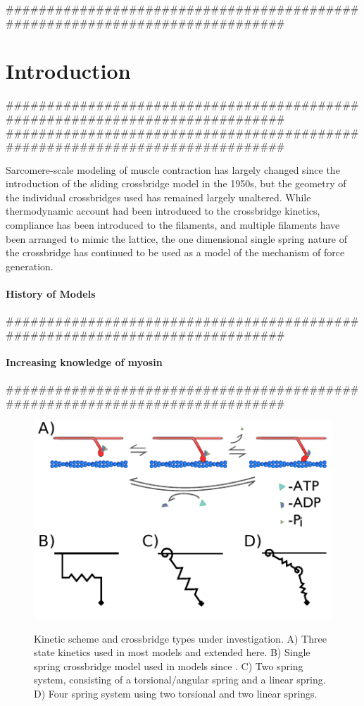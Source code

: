 \documentclass[11pt]{article}
\begin{document}
\begin{multicols}{2}


#############################################################################
\section*{Introduction}
#############################################################################
#############################################################################

Sarcomere-scale modeling of muscle contraction has largely changed since the introduction of the sliding crossbridge model in the 1950s, but the geometry of the individual crossbridges used has remained largely unaltered. While thermodynamic account had been introduced to the crossbridge kinetics, compliance has been introduced to the filaments, and multiple filaments have been arranged to mimic the lattice, the one dimensional single spring nature of the crossbridge has continued to be used as a model of the mechanism of force generation.

\paragraph*{History of Models}
#############################################################################

\paragraph*{Increasing knowledge of myosin}
#############################################################################

\begin{figure}[H]
    \begin{center}
    \includegraphics{../imgs/XBCycle.pdf}
    \label{xbtypes}
    \caption{{\small 
        Kinetic scheme and crossbridge types under investigation. 
        A) Three state kinetics used in most models and extended here. 
        B) Single spring crossbridge model used in models since \cite{Huxley57}. 
        C) Two spring system, consisting of a torsional/angular spring and a linear spring. 
        D) Four spring system using two torsional and two linear springs.}}
    \end{center}
\end{figure}


\end{multicols}
\end{document}
